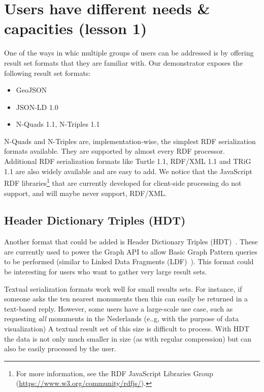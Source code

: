 \documentclass[a4paper]{scrartcl}
\begin{document}
\section{Users have different needs \& capacities (lesson 1)}

One of the ways in whic multiple groups of users can be addressed is
by offering result set formats that they are familiar with.  Our
demonstrator exposes the following result set formats:

\begin{itemize}

\item GeoJSON

\item JSON-LD 1.0

\item N-Quads 1.1, N-Triples 1.1

\end{itemize}

N-Quads and N-Triples are, implementation-wise, the simplest RDF
serialization formats available.  They are supported by almost every
RDF processor.  Additional RDF serialization formats like Turtle 1.1,
RDF/XML 1.1 and TRiG 1.1 are also widely available and are easy to
add.  We notice that the JavaScript RDF libraries\footnote{For more
  information, see the RDF JavaScript Libraries Group
  (\url{https://www.w3.org/community/rdfjs/}).} that are currently
developed for client-side processing do not support, and will maybe
never support, RDF/XML.


\subsection{Header Dictionary Triples (HDT)}
\label{sec:hdt}

Another format that could be added is Header Dictionary Triples
(HDT)~\cite{Fernandez2013}.  These are currently used to power the
Graph API to allow Basic Graph Pattern queries to be performed
(similar to Linked Data Fragments (LDF)~\cite{Verborgh2014}).  This
format could be interesting for users who want to gather very large
result sets.

Textual serialization formats work well for small results sets.  For
instance, if someone asks the ten nearest monuments then this can
easily be returned in a text-based reply.  However, some users have a
large-scale use case, such as requesting \emph{all} monuments in the
Nederlands (e..g, with the purpose of data visualization) A textual
result set of this size is difficult to process.  With HDT the data is
not only much smaller in size (as with regular compression) but can
also be easily processed by the user.
\end{document}
